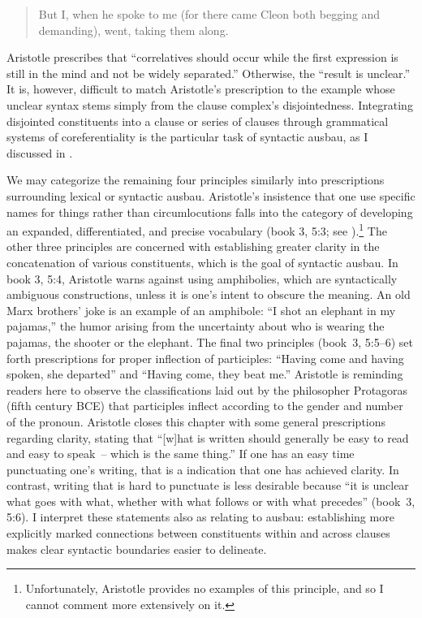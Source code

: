 \begin{quote}
But I, when he spoke to me (for there came Cleon both begging and demanding), went, taking them along.
\end{quote}

\noindent Aristotle prescribes that “correlatives should occur while the first expression is still in the mind and not be widely separated.” Otherwise, the “result is unclear.” It is, however, difficult to match Aristotle’s prescription to the example whose unclear syntax stems simply from the clause complex’s disjointedness. Integrating disjointed constituents into a clause or series of clauses through grammatical systems of coreferentiality is the particular task of syntactic ausbau, as I discussed in .

We may categorize the remaining four principles similarly into prescriptions surrounding lexical or syntactic ausbau. Aristotle’s insistence that one use specific names for things rather than circumlocutions falls into the category of developing an expanded, differentiated, and precise vocabulary (book 3, 5:3; see {}).\footnote{{Unfortunately, Aristotle provides no examples of this principle, and so I cannot comment more extensively on it.} } The other three principles are concerned with establishing greater clarity in the concatenation of various constituents, which is the goal of syntactic ausbau. In book 3, 5:4, Aristotle warns against using amphibolies, which are syntactically ambiguous constructions, unless it is one’s intent to obscure the meaning. An old Marx brothers’ joke is an example of an amphibole: “I shot an elephant in my pajamas,” the humor arising from the uncertainty about who is wearing the pajamas, the shooter or the elephant. The final two principles (book~3, 5:5--6) set forth prescriptions for proper inflection of participles: “Having come and having spoken, she departed” and “Having come, they beat me.” Aristotle is reminding readers here to observe the classifications laid out by the philosopher Protagoras (fifth century BCE) that participles inflect according to the gender and number of the pronoun. Aristotle closes this chapter with some general prescriptions regarding clarity, stating that “[w]hat is written should generally be easy to read and easy to speak~-- which is the same thing.” If one has an easy time punctuating one’s writing, that is a indication that one has achieved clarity. In contrast, writing that is hard to punctuate is less desirable because “it is unclear what goes with what, whether with what follows or with what precedes” (book~3, 5:6). I interpret these statements also as relating to ausbau: establishing more explicitly marked connections between constituents within and across clauses makes clear syntactic boundaries easier to delineate.\largerpage

